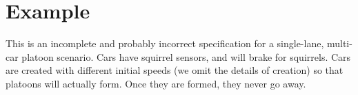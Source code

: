 


%
%
%
%


\section{Example}

This is an incomplete and probably incorrect specification for a
single-lane, multi-car platoon scenario.  Cars have squirrel sensors,
and will brake for squirrels.  Cars are created with
different initial speeds (we omit the details of creation) so that
platoons will actually form.  Once they are formed, they never go away.

